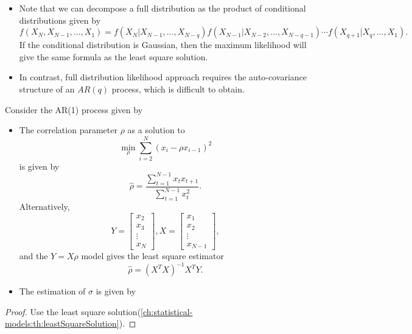 \begin{remark}
	\begin{itemize}
		\item Note that we can decompose a full distribution as the product of conditional distributions given by 
		$$f(X_N,X_{N-1},...,X_1) = f(X_N|X_{N-1},...,X_{N-q})f(X_{N-1}|X_{N-2},...,X_{N-q-1})\cdots f(X_{q+1}|X_{q},...,X_{1}).$$
		If the conditional distribution is Gaussian, then the maximum likelihood will give the same formula as the least square solution.
		\item In contrast, full distribution likelihood approach requires the auto-covariance structure of an $AR(q)$ process, which is difficult to obtain. 
	\end{itemize}
\end{remark}


\begin{lemma}\cite[53]{chatfield2003analysis}\cite[46]{tsay2005analysis}\label{ch:time-series-analysis:th:leastSquareEstimationOfCorrelationAR(1)}
Consider the AR(1) process given by
\begin{itemize}
	\item The correlation parameter $\rho$ as a solution to	
	$$\min_{\rho} \sum_{i=2}^N (x_i - \rho x_{i-1})^2$$
	is given by
	$$\hat{\rho} = \frac{\sum_{t=1}^{N-1} x_t x_{t+1}}{\sum_{t=1}^{N-1} x_t^2}.$$	
	Alternatively, 
	$$Y = \begin{bmatrix}
	x_2\\
	x_3\\
	\vdots\\
	x_N
	\end{bmatrix}, X = \begin{bmatrix}
	x_1\\
	x_2\\
	\vdots\\
	x_{N-1}
	\end{bmatrix},$$
	and the $Y = X\rho $ model gives the least square estimator 
	$$\hat{\rho} = (X^TX)^{-1}X^TY.$$
	\item The estimation of $\sigma$ is given by
\end{itemize}
\end{lemma}
\begin{proof}
Use the least square solution(\autoref{ch:statistical-models:th:leastSquareSolution}).	
\end{proof}


